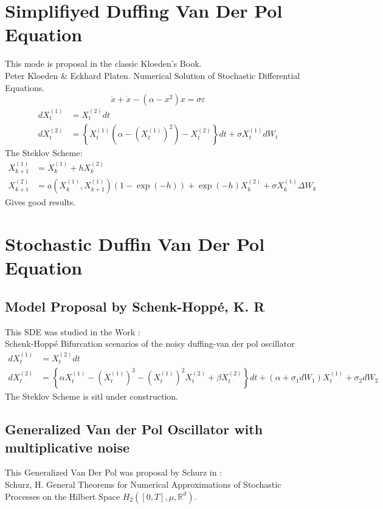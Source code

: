 \documentclass[review]{elsarticle}
\begin{document}
	\section{Simplifiyed Duffing Van Der Pol Equation}
		This mode is proposal in the classic Kloeden's Book. \\ 
		Peter Kloeden \& Eckhard Platen. Numerical Solution of Stochastic Differential Equations.
		$$
			\ddot{x}+\dot{x}-(\alpha-x^2)x=\sigma \varepsilon
		$$
		\begin{align*}
			dX_t^{(1)}&= X_t^{(2)} dt\\
			dX_t^{(2)}&=
				\left\{
				X_t^{(1)}
				\left(
					\alpha-(X_t^{(1)})^2
				\right)
				-X_t^{(2)}
			\right\}dt
			+\sigma X_t^{(1)} dW_t
		\end{align*}
		The Steklov Scheme:
		\begin{align*}
			X^{(1)}_{k+1} &= X^{(1)}_{k} + h X^{(2)}_{k} \\
			X^{(2)}_{k+1} & =a\left(X^{(1)}_{k},X^{(1)}_{k+1}\right)
				\left(
					1 - \exp(-h)
				\right)
				+ \exp(-h) X^{(2)}_{k} + \sigma X^{(1)}_{k} \Delta W_k
		\end{align*}
		Gives good results.
		
	\section{Stochastic Duffin Van Der Pol Equation}
	
		\subsection{Model Proposal by Schenk-Hoppé, K. R}
			This SDE was studied in the Work \cite{Schenk-Hoppe1996a}:\\
			Schenk-Hoppé Bifurcation scenarios of the noisy duffing-van der pol oscillator
			\begin{align*}
				dX_t^{(1)}
					&= X_t^{(2)} dt\\
				dX_t^{(2)} &=
				\left\{
					\alpha X_t^{(1)} 
					- \left( X_t ^ {(1)} \right) ^ 3
					- \left( X_t ^ {(1)} \right) ^ 2 X_t ^ {(2)}
					+\beta X_t^{(2)}
				\right\}dt
				+ \left( \alpha+\sigma_1 dW_1 \right)X_t^{(1)}
				+ \sigma_2 dW_2
			\end{align*}
			The Steklov Scheme is sitl under construction.
	
		\subsection{Generalized Van der Pol Oscillator with multiplicative noise}
			This Generalized Van Der Pol was proposal by Schurz in \cite{Schurz2003}:\\
			Schurz, H. General Theorems for Numerical Approximations of Stochastic Processes on the Hilbert 
			Space $H_2([0,T], \mu, \mathbb{R}^d).$
			
\end{document}
